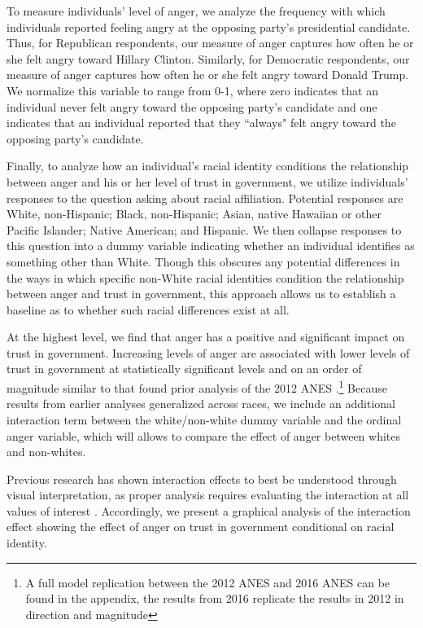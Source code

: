\documentclass[12t, letterpaper]{article}
\begin{document}
To measure individuals' level of anger, we analyze the frequency with which individuals reported feeling angry at the opposing party's presidential candidate. Thus, for Republican respondents, our measure of anger captures how often he or she felt angry toward Hillary Clinton. Similarly, for Democratic respondents, our measure of anger captures how often he or she felt angry toward Donald Trump. We normalize this variable to range from 0-1, where zero indicates that an individual never felt angry toward the opposing party's candidate and one indicates that an individual reported that they ``always" felt angry toward the opposing party's candidate. 

Finally, to analyze how an individual's racial identity conditions the relationship between anger and his or her level of trust in government, we utilize individuals' responses to the question asking about racial affiliation. Potential responses are White, non-Hispanic; Black, non-Hispanic; Asian, native Hawaiian or other Pacific Islander; Native American; and Hispanic. We then collapse responses to this question into a dummy variable indicating whether an individual identifies as something other than White. Though this obscures any potential differences in the ways in which specific non-White racial identities condition the relationship between anger and trust in government, this approach allows us to establish a baseline as to whether such racial differences exist at all.

At the highest level, we find that anger has a positive and significant impact on trust in government. Increasing levels of anger are associated with lower levels of trust in government at statistically significant levels and on an order of magnitude similar to that found prior analysis of the 2012 ANES \citep{webster2017}.\footnote{A full model replication between the 2012 ANES and 2016 ANES can be found in the appendix, the results from 2016 replicate the results in 2012 in direction and magnitude} Because results from earlier analyses generalized across races, we include an additional interaction term between the white/non-white dummy variable and the ordinal anger variable, which will allows to compare the effect of anger between whites and non-whites.

Previous research has shown interaction effects to best be understood through visual interpretation, as proper analysis requires evaluating the interaction at all values of interest \citep{brambor2006}. Accordingly, we present a graphical analysis of the interaction effect showing the effect of anger on trust in government conditional on racial identity.
\end{document}
